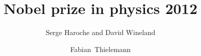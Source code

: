 \documentclass[english]{beamer}
\title[Nobelprize 2012]{Nobel prize in physics 2012}
\subtitle{Serge Haroche and David Wineland}
\author[F.~Thielemann]{Fabian~Thielemann}
\institute{Institute of Physics}
\newcommand{\backupbegin}{
   \newcounter{framenumberappendix}
   \setcounter{framenumberappendix}{\value{framenumber}}
}
\newcommand{\backupend}{
  \addtocounter{framenumberappendix}{-\value{framenumber}}
  \addtocounter{framenumber}{\value{framenumberappendix}} 
}
\begin{document}
  \begin{frame}[t]
    \titlepage
  \end{frame}
  
  
  
  
  

\end{document}
